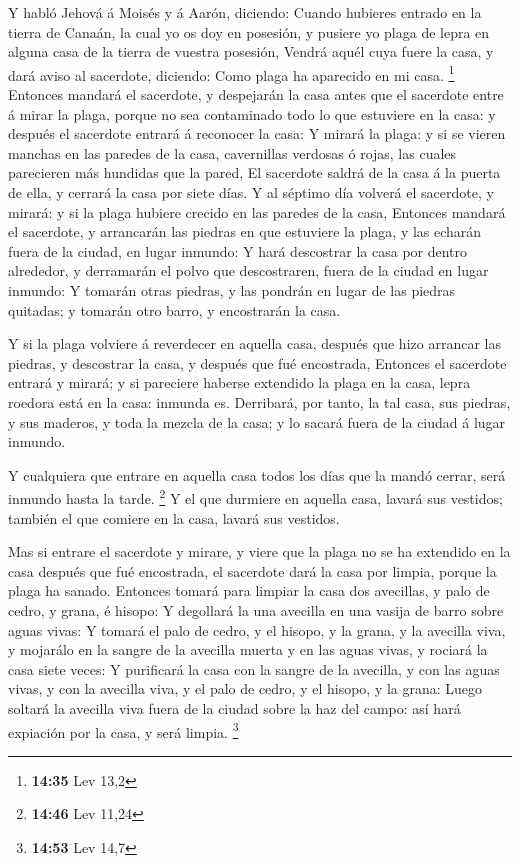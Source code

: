  Y habló Jehová á Moisés y á Aarón, diciendo: 
Cuando hubieres entrado en la tierra de Canaán, la cual yo os doy en
posesión, y pusiere yo plaga de lepra en alguna casa de la tierra de
vuestra posesión,  Vendrá aquél cuya fuere la casa, y dará
aviso al sacerdote, diciendo: Como plaga ha aparecido en mi casa.
\footnote{\textbf{14:35} Lev 13,2}  Entonces mandará el
sacerdote, y despejarán la casa antes que el sacerdote entre á mirar la
plaga, porque no sea contaminado todo lo que estuviere en la casa: y
después el sacerdote entrará á reconocer la casa:  Y mirará
la plaga: y si se vieren manchas en las paredes de la casa, cavernillas
verdosas ó rojas, las cuales parecieren más hundidas que la pared,
 El sacerdote saldrá de la casa á la puerta de ella, y
cerrará la casa por siete días.  Y al séptimo día volverá
el sacerdote, y mirará: y si la plaga hubiere crecido en las paredes de
la casa,  Entonces mandará el sacerdote, y arrancarán las
piedras en que estuviere la plaga, y las echarán fuera de la ciudad, en
lugar inmundo:  Y hará descostrar la casa por dentro
alrededor, y derramarán el polvo que descostraren, fuera de la ciudad en
lugar inmundo:  Y tomarán otras piedras, y las pondrán en
lugar de las piedras quitadas; y tomarán otro barro, y encostrarán la
casa.

 Y si la plaga volviere á reverdecer en aquella casa,
después que hizo arrancar las piedras, y descostrar la casa, y después
que fué encostrada,  Entonces el sacerdote entrará y
mirará; y si pareciere haberse extendido la plaga en la casa, lepra
roedora está en la casa: inmunda es.  Derribará, por tanto,
la tal casa, sus piedras, y sus maderos, y toda la mezcla de la casa; y
lo sacará fuera de la ciudad á lugar inmundo.

 Y cualquiera que entrare en aquella casa todos los días
que la mandó cerrar, será inmundo hasta la tarde. \footnote{\textbf{14:46}
  Lev 11,24}  Y el que durmiere en aquella casa, lavará sus
vestidos; también el que comiere en la casa, lavará sus vestidos.

 Mas si entrare el sacerdote y mirare, y viere que la plaga
no se ha extendido en la casa después que fué encostrada, el sacerdote
dará la casa por limpia, porque la plaga ha sanado. 
Entonces tomará para limpiar la casa dos avecillas, y palo de cedro, y
grana, é hisopo:  Y degollará la una avecilla en una vasija
de barro sobre aguas vivas:  Y tomará el palo de cedro, y
el hisopo, y la grana, y la avecilla viva, y mojarálo en la sangre de la
avecilla muerta y en las aguas vivas, y rociará la casa siete veces:
 Y purificará la casa con la sangre de la avecilla, y con
las aguas vivas, y con la avecilla viva, y el palo de cedro, y el
hisopo, y la grana:  Luego soltará la avecilla viva fuera
de la ciudad sobre la haz del campo: así hará expiación por la casa, y
será limpia. \footnote{\textbf{14:53} Lev 14,7}

